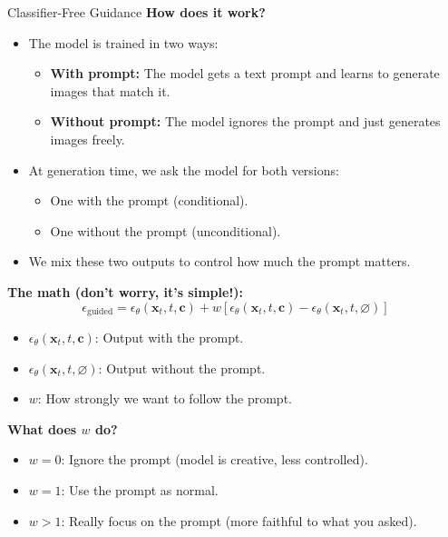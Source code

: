 \begin{frame}[allowframebreaks]{Classifier-Free Guidance}
    \textbf{How does it work?}
    \begin{itemize}
        \item The model is trained in two ways:
        \begin{itemize}
            \item \textbf{With prompt:} The model gets a text prompt and learns to generate images that match it.
            \item \textbf{Without prompt:} The model ignores the prompt and just generates images freely.
        \end{itemize}
        \item At generation time, we ask the model for both versions:
        \begin{itemize}
            \item One with the prompt (conditional).
            \item One without the prompt (unconditional).
        \end{itemize}
        \item We mix these two outputs to control how much the prompt matters.
    \end{itemize}

    \framebreak

    \textbf{The math (don't worry, it's simple!):}
    \[
        \epsilon_{\text{guided}} = \epsilon_\theta(\mathbf{x}_t, t, \mathbf{c}) + w \left[ \epsilon_\theta(\mathbf{x}_t, t, \mathbf{c}) - \epsilon_\theta(\mathbf{x}_t, t, \varnothing) \right]
    \]
    \begin{itemize}
        \item $\epsilon_\theta(\mathbf{x}_t, t, \mathbf{c})$: Output with the prompt.
        \item $\epsilon_\theta(\mathbf{x}_t, t, \varnothing)$: Output without the prompt.
        \item $w$: How strongly we want to follow the prompt.
    \end{itemize}

    \framebreak

    \textbf{What does $w$ do?}
    \begin{itemize}
        \item $w = 0$: Ignore the prompt (model is creative, less controlled).
        \item $w = 1$: Use the prompt as normal.
        \item $w > 1$: Really focus on the prompt (more faithful to what you asked).
    \end{itemize}


\end{frame}
